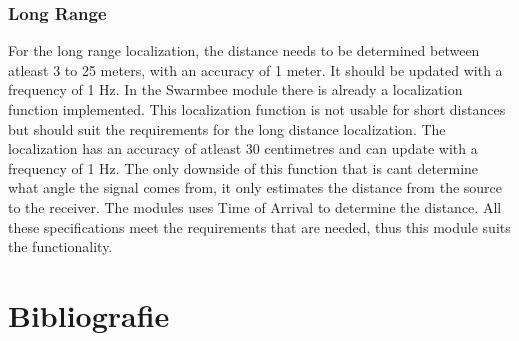 \documentclass[10pt,a4paper]{article}
\begin{document}
\subsubsection{Long Range}
For the long range localization, the distance needs to be determined between atleast 3 to 25 meters, with an accuracy of 1 meter. It should be updated with a frequency of 1 Hz. In the Swarmbee module there is already a localization function implemented. This localization function is not usable for short distances but should suit the requirements for the long distance localization. The localization has an accuracy of atleast 30 centimetres and can update with a frequency of 1 Hz. The only downside of this function that is cant determine what angle the signal comes from, it only estimates the distance from the source to the receiver. The modules uses Time of Arrival to determine the distance. All these specifications meet the requirements that are needed, thus this module suits the functionality. 



\section{Bibliografie}


\end{document}
